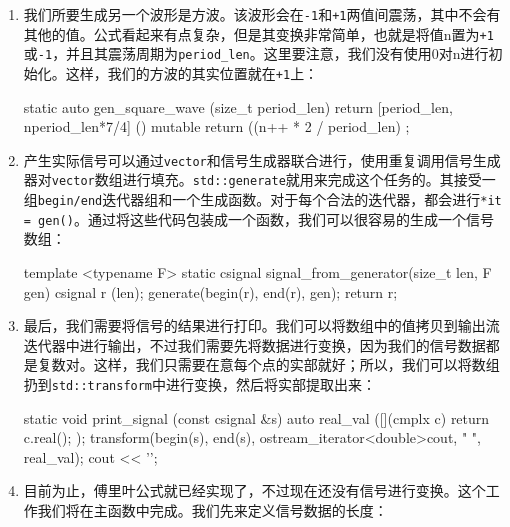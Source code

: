 \begin{enumerate}
\begin{codebox}[cpp]
static auto gen_cosine (size_t period_len){
    return [period_len, n{0}] () mutable {
        return cos(double(n++) * 2.0 * M_PI / period_len);
    };
}
\end{codebox}

\item 我们所要生成另一个波形是方波。该波形会在\texttt{-1}和\texttt{+1}两值间震荡，其中不会有其他的值。公式看起来有点复杂，但是其变换非常简单，也就是将值n置为\texttt{+1}或\texttt{-1}，并且其震荡周期为\texttt{period\_len}。这里要注意，我们没有使用0对n进行初始化。这样，我们的方波的其实位置就在\texttt{+1}上：

\begin{codebox}[cpp]
static auto gen_square_wave (size_t period_len)
{
    return [period_len, n{period_len*7/4}] () mutable {
        return ((n++ * 2 / period_len) %
    };
}
\end{codebox}

\item 产生实际信号可以通过\texttt{vector}和信号生成器联合进行，使用重复调用信号生成器对\texttt{vector}数组进行填充。\texttt{std::generate}就用来完成这个任务的。其接受一组\texttt{begin/end}迭代器组和一个生成函数。对于每个合法的迭代器，都会进行\texttt{*it = gen()}。通过将这些代码包装成一个函数，我们可以很容易的生成一个信号数组：

\begin{codebox}[cpp]
template <typename F>
static csignal signal_from_generator(size_t len, F gen)
{
    csignal r (len);
    generate(begin(r), end(r), gen);
    return r;
}
\end{codebox}

\item 最后，我们需要将信号的结果进行打印。我们可以将数组中的值拷贝到输出流迭代器中进行输出，不过我们需要先将数据进行变换，因为我们的信号数据都是复数对。这样，我们只需要在意每个点的实部就好；所以，我们可以将数组扔到\texttt{std::transform}中进行变换，然后将实部提取出来：

\begin{codebox}[cpp]
static void print_signal (const csignal &s)
{
    auto real_val ([](cmplx c) { return c.real(); });
    transform(begin(s), end(s),
             ostream_iterator<double>{cout, " "}, real_val);
    cout << '\n';
}
\end{codebox}

\item 目前为止，傅里叶公式就已经实现了，不过现在还没有信号进行变换。这个工作我们将在主函数中完成。我们先来定义信号数据的长度：


\end{enumerate}
